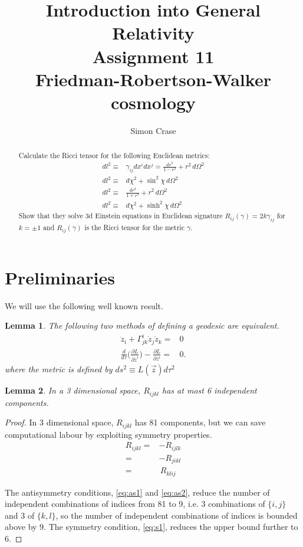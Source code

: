 \documentclass[]{article}
\title{Introduction into General Relativity\\Assignment 11\\Friedman-Robertson-Walker cosmology}
\author{Simon Crase}
\newtheorem{lemma}{Lemma}
\begin{document}
\maketitle

\begin{abstract}
Calculate the Ricci tensor for the following Euclidean metrics:
\begin{align*}
dl^2\equiv&\gamma_{ij}dx^idx^j=\frac{dr^2}{1-r^2}+r^2\,d\Omega^2\\
dl^2\equiv&d\chi^2+\sin^2 \chi\,d\Omega^2\\
dl^2\equiv&\frac{dr^2}{1+r^2}+r^2\,d\Omega^2\\
dl^2\equiv&d\chi^2+\sinh^2 \chi\,d\Omega^2
\end{align*}
Show that they solve 3d Einstein equations in Euclidean signature $R_{ij}(\gamma)=2k\gamma_{ij}$ for $k=\pm 1$ and $R_{ij}(\gamma)$ is the Ricci tensor for the metric $\gamma$.
\end{abstract}

\tableofcontents

\section{Preliminaries}

We will use the following well known result.
\begin{lemma}\label{lemma:geodesic}
	The following two methods of defining a geodesic are equivalent.
	\begin{align*}
	\ddot{z}_i + \Gamma^i_{jk}\dot{z}_j \dot{z}_k =& 0 \\
	\frac{d}{d \tau}\Big(\frac{\partial L}{\partial \dot{z}^i}\Big)-\frac{\partial L}{\partial z^i}=&0.
	\end{align*}
	where the metric is defined by $ds^2\equiv L(\vec{z}) d\tau^2$ 
\end{lemma}

\begin{lemma}\label{lemma:independent-components}
	In a 3 dimensional space, $R_{ijkl}$ has at most 6 independent components.
\end{lemma}
\begin{proof}
	In 3 dimensional space, $R_{ijkl}$ has 81 components, but we can save computational labour by exploiting symmetry properties.
	\begin{align}
	R_{ijkl}=&-R_{ijlk}\label{eq:as1}\\
	=&-R_{jikl}\label{eq:as2}\\
	=&\,R_{klij}\label{eq:s1}
	\end{align}
	
	The antisymmetry conditions, \eqref{eq:as1} and \eqref{eq:as2}, reduce the number of independent combinations of indices from 81 to 9, i.e. 3 combinations of $\{i,j\}$ and 3 of $\{k,l\}$, so the number of independent combinations of indices is bounded above by 9. The symmetry condition, \eqref{eq:s1}, reduces the upper bound further to 6.
\end{proof}
\end{document}
